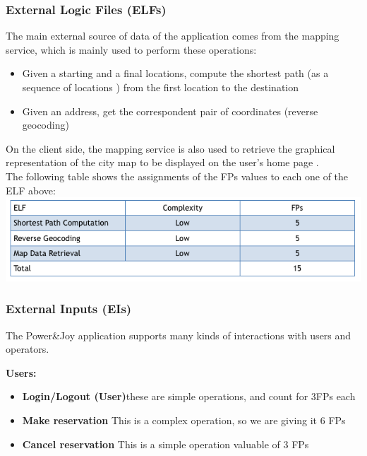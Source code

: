 \documentclass{article}
\begin{document}
\begin{flushleft}
   






\subsubsection{External Logic Files (ELFs)} %
The main external source of data of the application comes from the mapping service, which is mainly used to perform these operations:
\begin{itemize}
\item Given a starting and a final locations, compute the shortest path (as a  sequence of locations ) from the first location to the destination
\item Given an address, get the correspondent pair of coordinates (reverse geocoding)
\end{itemize}

On the client side, the mapping service is also used to retrieve the graphical representation of the city map to be displayed on the user's home page .\\

The following table  shows the assignments of the FPs values to each one of the ELF above:
\vspace{0.5cm}
\includegraphics[scale=0.5]{ELF}




\subsubsection{External Inputs (EIs)} %

The Power\&Joy application supports many kinds of interactions with users and operators.

\textbf{Users:}
\begin{itemize}
\item\textbf{Login/Logout (User)}these are simple operations, and count for 3FPs each
\item\textbf{Make reservation} This is a complex operation, so we are giving it 6 FPs
\item\textbf{Cancel reservation} This is a simple operation valuable of 3 FPs


\end{itemize}
\end{flushleft}
\end{document}
